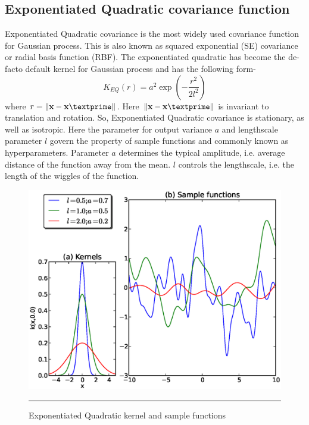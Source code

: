 \subsection{Exponentiated Quadratic covariance function}
Exponentiated Quadratic covariance is the most widely used covariance function for Gaussian
process. This is also known as squared exponential (SE) covariance or radial basis function (RBF).
The exponentiated quadratic has become the de-facto default kernel for Gaussian process and
has the following form-
\begin{equation} \label{eq:EQ_cov}
K_{EQ}(r)= a^2 \exp \left(-\frac{r^2}{2l^2}\right)
\end{equation}
where $r=\lVert \textbf{x}-\textbf{x}\textprime \rVert$. 
Here $\lVert \textbf{x}-\textbf{x}\textprime \rVert$ is invariant to translation and rotation.
So, Exponentiated Quadratic covariance is stationary, as well as isotropic.
Here the parameter for output variance $a$ and lengthscale parameter $l$ govern the property of
sample functions and commonly known as hyperparameters. Parameter $a$ determines the typical amplitude, i.e. 
average distance of the function away from the mean. $l$ controls the lengthscale, i.e. the length 
of the wiggles of the function. 

\begin{figure}[t]
	\centering
		\includegraphics[width=14cm,keepaspectratio]{diagrams/SE_cov.eps}
		\rule{35em}{0.5pt}
	\caption[Exponentiated Quadratic kernel and sample functions]
		{Exponentiated Quadratic kernel and sample functions}
	\label{fig:Exponentiated_Quadratic_covariance}
\end{figure}

